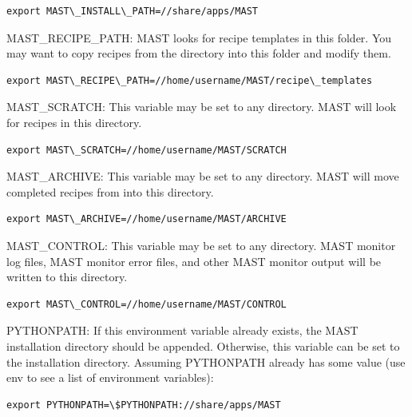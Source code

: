 \documentclass[letterpaper,10pt,english]{sphinxmanual}
\begin{document}
\begin{Verbatim}[commandchars=\\\{\}]
export MAST\_INSTALL\_PATH=//share/apps/MAST
\end{Verbatim}

MAST\_RECIPE\_PATH: MAST looks for recipe templates in this folder. You may want to copy recipes from the  directory into this folder and modify them.

\begin{Verbatim}[commandchars=\\\{\}]
export MAST\_RECIPE\_PATH=//home/username/MAST/recipe\_templates
\end{Verbatim}

MAST\_SCRATCH: This variable may be set to any directory. MAST will look for recipes in this directory.

\begin{Verbatim}[commandchars=\\\{\}]
export MAST\_SCRATCH=//home/username/MAST/SCRATCH
\end{Verbatim}

MAST\_ARCHIVE: This variable may be set to any directory. MAST will move completed recipes from  into this directory.

\begin{Verbatim}[commandchars=\\\{\}]
export MAST\_ARCHIVE=//home/username/MAST/ARCHIVE
\end{Verbatim}

MAST\_CONTROL: This variable may be set to any directory. MAST monitor log files, MAST monitor error files, and other MAST monitor output will be written to this directory.

\begin{Verbatim}[commandchars=\\\{\}]
export MAST\_CONTROL=//home/username/MAST/CONTROL
\end{Verbatim}

PYTHONPATH: If this environment variable already exists, the MAST installation directory should be appended. Otherwise, this variable can be set to the installation directory. Assuming PYTHONPATH already has some value (use env to see a list of environment variables):

\begin{Verbatim}[commandchars=\\\{\}]
export PYTHONPATH=\$PYTHONPATH://share/apps/MAST
\end{Verbatim}
\end{document}
